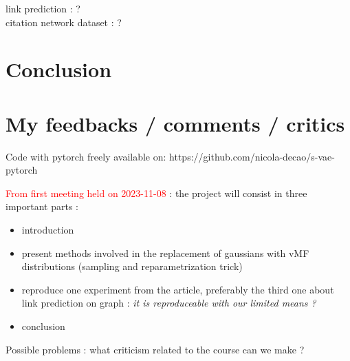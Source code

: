 \documentclass[12pt]{article}
\newcommand{\red}[1]{\textcolor{red}{#1}}
\begin{document}
link prediction : ? \\ 
citation network dataset : ?


\section{Conclusion}

\section{My feedbacks / comments / critics}

Code with pytorch freely available on: https://github.com/nicola-decao/s-vae-pytorch

\red{From first meeting held on 2023-11-08} : the project will consist in three important parts :
\begin{itemize}
    \item introduction
    \item present methods involved in the replacement of gaussians with vMF distributions (sampling and reparametrization trick)
    \item reproduce one experiment from the article, preferably the third one about link prediction on graph : \textit{it is reproduceable with our limited means ?} 
    \item conclusion
\end{itemize}

Possible problems : what criticism related to the course can we make ? 
\end{document}
